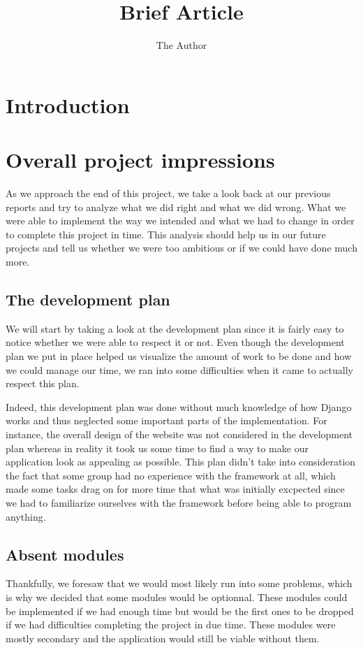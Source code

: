 \documentclass[11pt, a4paper]{article}      %
\title{Brief Article}
\author{The Author}
\begin{document}

\section{Introduction}

\section{Overall project impressions}

As we approach the end of this project, we take a look back at our previous reports and try to analyze what we did right and what we did wrong. What we were able to implement the way we intended and what we had to change in order to complete this project in time. This analysis should help us in our future projects and tell us whether we were too ambitious or if we could have done much more.

\subsection{The development plan}

We will start by taking a look at the development plan since it is fairly easy to notice whether we were able to respect it or not. Even though the development plan we put in place helped us visualize the amount of work to be done and how we could manage our time, we ran into some difficulties when it came to actually respect this plan.

Indeed, this development plan was done without much knowledge of how Django works and thus neglected some important parts of the implementation. For instance, the overall design of the website was not considered in the development plan whereas in reality it took us some time to find a way to make our application look as appealing as possible. 
This plan didn't take into consideration the fact that some group had no experience with the framework at all, which made some tasks drag on for more time that what was initially excpected since we had to familiarize ourselves with the framework before being able to program anything. 

\subsection{Absent modules}
Thankfully, we foresaw that we would most likely run into some problems, which is why we decided that some modules would be optionnal. These modules could be implemented if we had enough time but would be the first ones to be dropped if we had difficulties completing the project in due time. These modules were mostly secondary and the application would still be viable without them.
\end{document}
